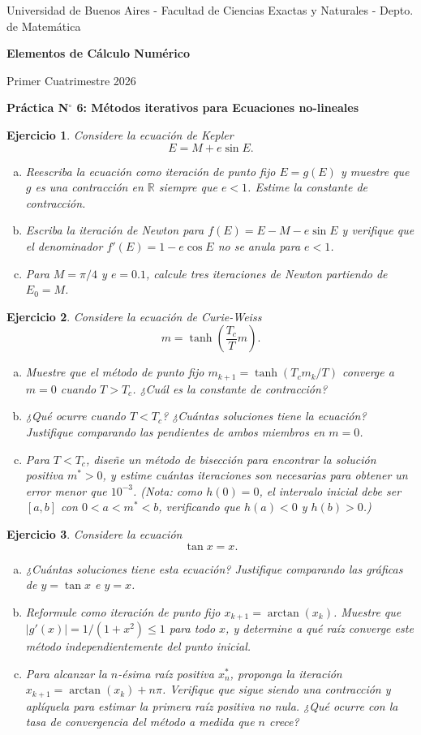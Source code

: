 \documentclass[12pt]{article}
\newtheorem{exercise}{Ejercicio}
\newcommand{\bej}{\begin{exercise}\rm}
\newcommand{\fej}{\end{exercise}}
\begin{document}
\centerline{{\small Universidad de Buenos Aires - Facultad de Ciencias Exactas y Naturales - Depto. de Matemática}}
 
 \vskip 0.2cm
 \hrulefill
 \vskip 0.2cm

 \centerline{{\bf\Huge {\sc Elementos de Cálculo Numérico}}}
 \vskip 0.2cm
 \centerline{\ttfamily Primer Cuatrimestre 2026}
 \hrulefill

 \bigskip
 \centerline{\bf Práctica N$^\circ$ 6: Métodos iterativos para Ecuaciones no-lineales}
 \bigskip

\bej Considere la ecuación de Kepler
\[
E=M+e\sin E.
\]
\begin{enumerate}[(a)]
\item Reescriba la ecuación como iteración de punto fijo $E=g(E)$ y muestre que $g$ es una contracción en $\mathbb{R}$ siempre que $e<1$. Estime la constante de contracción.
\item Escriba la iteración de Newton para $f(E)=E-M-e\sin E$ y verifique que el denominador $f'(E)=1-e\cos E$ no se anula para $e<1$.
\item Para $M=\pi/4$ y $e=0.1$, calcule tres iteraciones de Newton partiendo de $E_0=M$.
\end{enumerate}
\fej

\bej Considere la ecuación de Curie-Weiss
\[
m=\tanh\!\left(\frac{T_c}{T}m\right).
\]
\begin{enumerate}[(a)]
\item Muestre que el método de punto fijo $m_{k+1}=\tanh(T_c m_k/T)$ converge a $m=0$ cuando $T>T_c$. ¿Cuál es la constante de contracción?
\item ¿Qué ocurre cuando $T<T_c$? ¿Cuántas soluciones tiene la ecuación? Justifique comparando las pendientes de ambos miembros en $m=0$.
\item Para $T<T_c$, diseñe un método de bisección para encontrar la solución positiva $m^*>0$, y estime cuántas iteraciones son necesarias para obtener un error menor que $10^{-3}$. (Nota: como $h(0)=0$, el intervalo inicial debe ser $[a,b]$ con $0<a<m^*<b$, verificando que $h(a)<0$ y $h(b)>0$.)
\end{enumerate}
\fej

\bej Considere la ecuación
\[
\tan x=x.
\]
\begin{enumerate}[(a)]
\item ¿Cuántas soluciones tiene esta ecuación? Justifique comparando las gráficas de $y=\tan x$ e $y=x$.
\item Reformule como iteración de punto fijo $x_{k+1}=\arctan(x_k)$. Muestre que $|g'(x)|=1/(1+x^2)\le 1$ para todo $x$, y determine a qué raíz converge este método independientemente del punto inicial.
\item Para alcanzar la $n$-ésima raíz positiva $x_n^*$, proponga la iteración $x_{k+1}=\arctan(x_k)+n\pi$. Verifique que sigue siendo una contracción y aplíquela para estimar la primera raíz positiva no nula. ¿Qué ocurre con la tasa de convergencia del método a medida que $n$ crece?
\end{enumerate}
\fej
\end{document}
